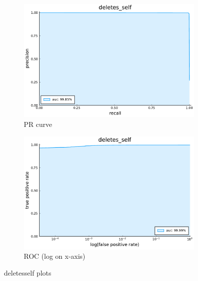 \begin{figure}
    \centering
    \begin{subfigure}{.49\textwidth}
      \centering
      \includegraphics[width=1\linewidth]{pdfs/modperf/deletes_self.bson-pr.pdf}
      \caption{PR curve}
    \end{subfigure}
    \begin{subfigure}{.49\textwidth}
        \centering
        \includegraphics[width=1\linewidth]{pdfs/modperf/deletes_self.bson-roclog.pdf}
        \caption{ROC (log on x-axis)}
    \end{subfigure}
    \caption{deletesself plots}
    \label{fig:fig}
\end{figure}

